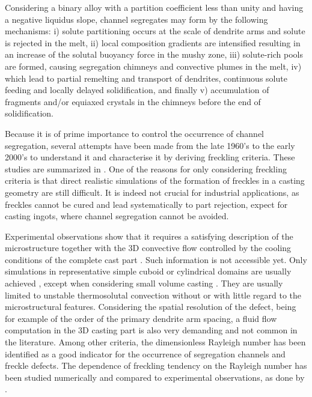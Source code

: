 Considering a binary alloy with a partition coefficient less than unity and having a negative liquidus slope, 
channel segregates may form by the following mechanisms: i) solute partitioning occurs at the scale of dendrite arms and 
solute is rejected in the melt, ii) local composition gradients are intensified resulting in an increase of the 
solutal buoyancy force in the mushy zone, iii) solute-rich pools are formed, causing segregation chimneys and convective plumes in the melt, 
iv) which lead to partial remelting and transport of dendrites, continuous solute feeding and locally delayed solidification,
and finally v) accumulation of fragments and/or equiaxed crystals in the chimneys before the end of solidification.

Because it is of prime importance to control the occurrence of channel segregation, several attempts have been made 
from the late 1960’s \citep{flemings_macrosegregation:_1967, flemings_macrosegregation:_1968-1,flemings_macrosegregation:_1968} 
to the early 2000’s \citep{ramirez_evaluation_2003} to understand it and characterise it by deriving freckling criteria. 
These studies are summarized in \citep{auburtin_determination_1998}. One of the reasons for only considering freckling criteria 
is that direct realistic simulations of the formation of freckles in a casting geometry are still difficult.
It is indeed not crucial for industrial applications, as freckles cannot be cured and lead systematically to part rejection, expect for casting ingots, 
where channel segregation cannot be avoided.

Experimental observations show that it requires a satisfying description of the microstructure together 
with the 3D convective flow controlled by the cooling conditions of the complete cast part \citep{shevchenko_chimney_2013}. 
Such information is not accessible yet. Only simulations in representative simple cuboid or cylindrical domains are 
usually achieved \citep{felicelli_simulation_1991,felicelli_modeling_1998,kohler_peritectic_2008,guo_three-dimensional_2003}, 
except when considering small volume casting \citep{desbiolles_micro-macrosegregation_2003}. 
They are usually limited to unstable thermosolutal convection without or with 
little regard to the microstructural features. Considering the spatial resolution of the defect, being for example of the 
order of the primary dendrite arm spacing, a fluid flow computation in the 3D casting part is also very demanding and not 
common in the literature. 
Among  other criteria, the dimensionless Rayleigh number has been identified as a good indicator 
for  the occurrence of segregation channels and freckle defects. The dependence of freckling tendency on the 
Rayleigh number has been studied numerically and compared to experimental observations, as done 
by \citep{ramirez_evaluation_2003}.


